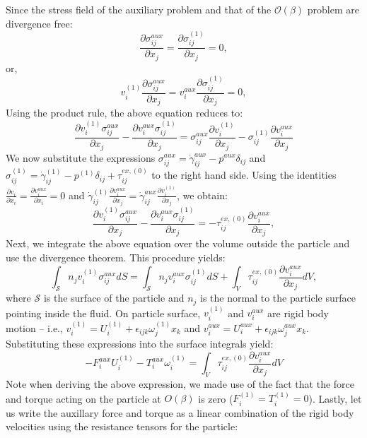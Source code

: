 \documentclass{jfm}
\begin{document}
Since the stress field of the auxiliary problem and that of the $\mathcal{O}(\beta)$ problem are divergence free:
\begin{equation}
    \frac{\partial \sigma_{ij}^{aux}}{\partial x_j} =\frac{\partial \sigma_{ij}^{(1)}}{\partial x_j} =0,
\end{equation}
or,
\begin{equation}
    v_i^{(1)}\frac{\partial \sigma_{ij}^{aux}}{\partial x_j} =v_i^{aux}\frac{\partial \sigma_{ij}^{(1)}}{\partial x_j} =0,
\end{equation}
Using the product rule, the above equation reduces to:
\begin{equation}
    \frac{\partial v_i^{(1)}\sigma_{ij}^{aux}}{\partial x_j} - \frac{\partial v_i^{aux}\sigma_{ij}^{(1)}}{\partial x_j} =\sigma_{ij}^{aux}\frac{\partial v_i^{(1)}}{\partial x_j}-\sigma_{ij}^{(1)}\frac{\partial v_i^{aux}}{\partial x_j}
\end{equation}
We now substitute the expressions $\sigma_{ij}^{aux} = \dot{\gamma}_{ij}^{aux} - p^{aux}\delta_{ij}$ and $\sigma_{ij}^{(1)} = \dot{\gamma}_{ij}^{(1)}-p^{(1)}\delta_{ij}+\tau_{ij}^{ex,(0)}$ to the right hand side.  Using the identities $\frac{\partial v_i}{\partial x_i} = \frac{\partial v_i^{aux}}{\partial x_i} = 0$ and $\dot{\gamma}_{ij}^{(1)}\frac{\partial v_i^{aux}}{\partial x_j} = \dot{\gamma}_{ij}^{aux}\frac{\partial v_i^{(1)}}{\partial x_j}$, we obtain:
\begin{equation}
    \frac{\partial v_i^{(1)}\sigma_{ij}^{aux}}{\partial x_j} - \frac{\partial v_i^{aux}\sigma_{ij}^{(1)}}{\partial x_j} = -\tau_{ij}^{ex,(0)}\frac{\partial v_i^{aux}}{\partial x_j},
\end{equation}
Next, we integrate the above equation over the volume outside the particle and use the divergence theorem.  This procedure yields:
\begin{equation}
  \int_{\mathcal{S}} n_j v_i^{(1)}\sigma_{ij}^{aux}dS = \int_{\mathcal{S}}n_jv_i^{aux}\sigma_{ij}^{(1)}dS + \int_{V}\tau_{ij}^{ex,(0)}\frac{\partial v_i^{aux}}{\partial x_j}dV,
\end{equation}
where $\mathcal{S}$ is the surface of the particle and $n_j$ is the normal to the particle surface pointing inside the fluid. On particle surface,  $v_i^{(1)}$ and $v_i^{aux}$ are rigid body motion -- i.e., $v_i^{(1)} = U_i^{(1)} + \epsilon_{ijk} \omega_j^{(1)}x_k$ and $v_i^{aux} = U_i^{aux} + \epsilon_{ijk} \omega_j^{aux}x_k$. Substituting these expressions into the surface integrals yield:
\begin{equation} \label{eqn:last_step_reciprocal}
      -F_i^{aux} U_i^{(1)}-T_i^{aux}\omega_i^{(1)} = \int_{V}\tau_{ij}^{ex,(0)}\frac{\partial v_i^{aux}}{\partial x_j}dV
\end{equation}
Note when deriving the above expression, we made use of the fact that the force and torque acting on the particle at $O(\beta)$ is zero ($F_i^{(1)} = T_i^{(1)} = 0$).  Lastly, let us write the auxillary force and torque as a linear combination of the rigid body velocities using the resistance tensors for the particle:
\end{document}
